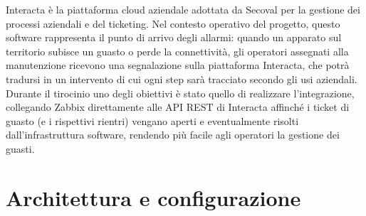 \documentclass[12pt, a4paper, oneside]{report}
\begin{document}
Interacta è la piattaforma cloud aziendale adottata da Secoval per la gestione dei processi aziendali e del ticketing\parencite{Interacta}. Nel contesto operativo del progetto, questo software rappresenta il punto di arrivo degli allarmi: quando un apparato sul territorio subisce un guasto o perde la connettività, gli operatori assegnati alla manutenzione ricevono una segnalazione sulla piattaforma Interacta, che potrà tradursi in un intervento di cui ogni step sarà tracciato secondo gli usi aziendali. Durante il tirocinio uno degli obiettivi è stato quello di realizzare l'integrazione, collegando Zabbix direttamente alle API REST di Interacta affinché i ticket di guasto (e i rispettivi rientri) vengano aperti e eventualmente risolti dall'infrastruttura software, rendendo più facile agli operatori la gestione dei guasti.




\chapter{Architettura e configurazione}
\end{document}
